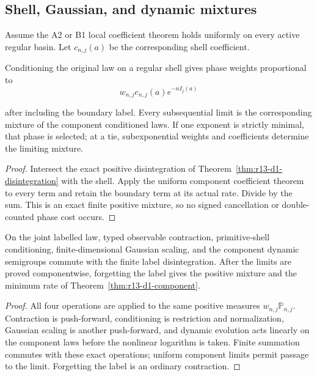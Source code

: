 \subsection{Shell, Gaussian, and dynamic mixtures}

Assume the A2 or B1 local coefficient theorem holds uniformly on every active
regular basin.  Let $c_{n,j}(a)$ be the corresponding shell coefficient.

\begin{theorem}
\label{thm:r13-d1-shell}
Conditioning the original law on a regular shell gives phase weights
proportional to
\[
 w_{n,j}c_{n,j}(a)
 e^{-nI_j(a)}
\]

after including the boundary label.  Every subsequential limit is the
corresponding mixture of the component conditioned laws.  If one exponent is
strictly minimal, that phase is selected; at a tie, subexponential weights and
coefficients determine the limiting mixture.
\end{theorem}

\begin{proof}
Intersect the exact positive disintegration of
Theorem~\ref{thm:r13-d1-disintegration} with the shell.  Apply the uniform
component coefficient theorem to every term and retain the boundary term at
its actual rate.  Divide by the sum.  This is an exact finite positive mixture,
so no signed cancellation or double-counted phase cost occurs.
\end{proof}

\begin{theorem}
\label{thm:r13-d1-commute}
On the joint labelled law, typed observable contraction, primitive-shell
conditioning, finite-dimensional Gaussian scaling, and the component dynamic
semigroups commute with the finite label disintegration.  After the limits are
proved componentwise, forgetting the label gives the positive mixture and the
minimum rate of Theorem~\ref{thm:r13-d1-component}.
\end{theorem}

\begin{proof}
All four operations are applied to the same positive measures
$w_{n,j}\mathbb P_{n,j}$.  Contraction is push-forward, conditioning is
restriction and normalization, Gaussian scaling is another push-forward, and
dynamic evolution acts linearly on the component laws before the nonlinear
logarithm is taken.  Finite summation commutes with these exact operations;
uniform component limits permit passage to the limit.  Forgetting the label
is an ordinary contraction.
\end{proof}

